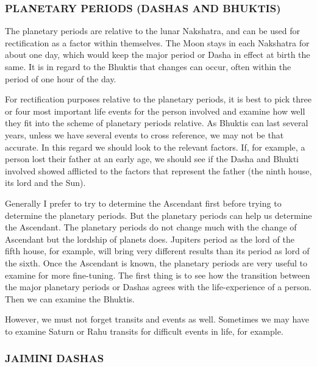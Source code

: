  

\subsubsection{PLANETARY PERIODS (DASHAS AND BHUKTIS)}

 

The planetary periods are relative to the lunar Nakshatra, and can be used for rectification as a factor within themselves. The Moon stays in each Nakshatra for about one day, which would keep the major period or Dasha in effect at birth the same. It is in regard to the Bhuktis that changes can occur, often within the period of one hour of the day.

 

For rectification purposes relative to the planetary periods, it is best to pick three or four most important life events for the person involved and examine how well they fit into the scheme of planetary periods relative. As Bhuktis can last several years, unless we have several events to cross reference, we may not be that accurate. In this regard we should look to the relevant factors. If, for example, a person lost their father at an early age, we should see if the Dasha and Bhukti involved showed afflicted to the factors that represent the father (the ninth house, its lord and the Sun).

 

Generally I prefer to try to determine the Ascendant first before trying to determine the planetary periods. But the planetary periods can help us determine the Ascendant. The planetary periods do not change much with the change of Ascendant but the lordship of planets does. Jupiters period as the lord of the fifth house, for example, will bring very different results than its period as lord of the sixth. Once the Ascendant is known, the planetary periods are very useful to examine for more fine-tuning. The first thing is to see how the transition between the major planetary periods or Dashas agrees with the life-experience of a person. Then we can examine the Bhuktis.

 

However, we must not forget transits and events as well. Sometimes we may have to examine Saturn or Rahu transits for difficult events in life, for example.

 

\subsubsection{JAIMINI DASHAS}

